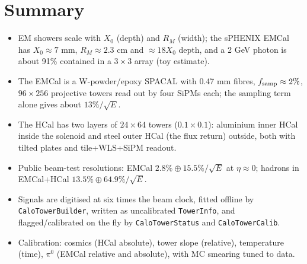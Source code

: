 \documentclass[11pt,letterpaper]{article}
\newcommand{\code}[1]{\texttt{#1}}
\begin{document}
\section{Summary}
\begin{itemize}
\item EM showers scale with $X_0$ (depth) and $R_M$ (width); the sPHENIX EMCal has $X_0\approx7$ mm, $R_M\approx2.3$ cm and $\approx18X_0$ depth, and a 2 GeV photon is about 91\% contained in a $3\times3$ array (toy estimate).
\item The EMCal is a W-powder/epoxy SPACAL with 0.47 mm fibres, $f_{\rm samp}\approx2\%$, $96\times256$ projective towers read out by four SiPMs each; the sampling term alone gives about $13\%/\sqrt{E}$.
\item The HCal has two layers of $24\times64$ towers ($0.1\times0.1$): aluminium inner HCal inside the solenoid and steel outer HCal (the flux return) outside, both with tilted plates and tile+WLS+SiPM readout.
\item Public beam-test resolutions: EMCal $2.8\%\oplus15.5\%/\sqrt{E}$ at $\eta\approx0$; hadrons in EMCal+HCal $13.5\%\oplus64.9\%/\sqrt{E}$.
\item Signals are digitised at six times the beam clock, fitted offline by \code{CaloTowerBuilder}, written as uncalibrated \code{TowerInfo}, and flagged/calibrated on the fly by \code{CaloTowerStatus} and \code{CaloTowerCalib}.
\item Calibration: cosmics (HCal absolute), tower slope (relative), temperature (time), $\pi^0$ (EMCal relative and absolute), with MC smearing tuned to data.
\end{itemize}

\end{document}

